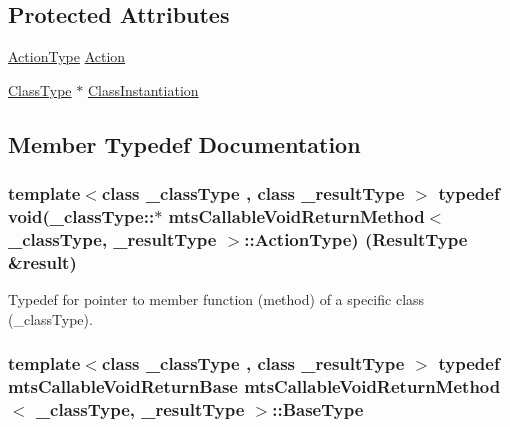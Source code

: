 \subsection*{Protected Attributes}
\begin{DoxyCompactItemize}
\item 
\hyperlink{classmts_callable_void_return_method_a8fcdd120f008efea73b3d51cbb34f773}{Action\+Type} \hyperlink{classmts_callable_void_return_method_ae6e1e00e4a13c6e6a6047323adf7707d}{Action}
\item 
\hyperlink{classmts_callable_void_return_method_a2bea77e5dd239ec2a1d3558dd3ca1776}{Class\+Type} $\ast$ \hyperlink{classmts_callable_void_return_method_a38ecd87e4473a2f42fde5567cd637937}{Class\+Instantiation}
\end{DoxyCompactItemize}


\subsection{Member Typedef Documentation}
\hypertarget{classmts_callable_void_return_method_a8fcdd120f008efea73b3d51cbb34f773}{}
\subsubsection[{Action\+Type}]{\setlength{\rightskip}{0pt plus 5cm}template$<$class \+\_\+class\+Type , class \+\_\+result\+Type $>$ typedef void(\+\_\+class\+Type\+::$\ast$ {\bf mts\+Callable\+Void\+Return\+Method}$<$ \+\_\+class\+Type, \+\_\+result\+Type $>$\+::Action\+Type) ({\bf Result\+Type} \&result)}\label{classmts_callable_void_return_method_a8fcdd120f008efea73b3d51cbb34f773}
Typedef for pointer to member function (method) of a specific class (\+\_\+class\+Type). \hypertarget{classmts_callable_void_return_method_a01907ccc09041bebecb2085a84f74bb1}{}
\subsubsection[{Base\+Type}]{\setlength{\rightskip}{0pt plus 5cm}template$<$class \+\_\+class\+Type , class \+\_\+result\+Type $>$ typedef {\bf mts\+Callable\+Void\+Return\+Base} {\bf mts\+Callable\+Void\+Return\+Method}$<$ \+\_\+class\+Type, \+\_\+result\+Type $>$\+::{\bf Base\+Type}}\label{classmts_callable_void_return_method_a01907ccc09041bebecb2085a84f74bb1}
\hypertarget{classmts_callable_void_return_method_a2bea77e5dd239ec2a1d3558dd3ca1776}{}
